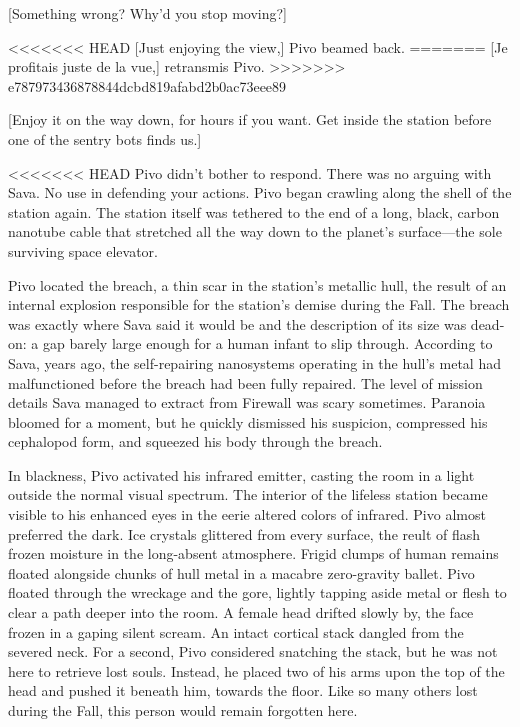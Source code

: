[Something wrong? Why'd you stop moving?] 

<<<<<<< HEAD
[Just enjoying the view,] Pivo beamed back. 
=======
[Je profitais juste de la vue,] retransmis Pivo. 
>>>>>>> e787973436878844dcbd819afabd2b0ac73eee89

[Enjoy it on the way down, for hours if you want. Get inside the station before one of the sentry bots finds us.] 

<<<<<<< HEAD
Pivo didn't bother to respond. There was no arguing with Sava. No use in defending your actions. Pivo began crawling along the shell of the station again. The station itself was tethered to the end of a long, black, carbon nanotube cable that stretched all the way down to the planet's surface—the sole surviving space elevator. 

Pivo located the breach, a thin scar in the station's metallic hull, the result of an internal explosion responsible for the station's demise during the Fall. The breach was exactly where Sava said it would be and the description of its size was dead-on: a gap barely large enough for a human infant to slip through. According to Sava, years ago, the self-repairing nanosystems operating in the hull's metal had malfunctioned before the breach had been fully repaired. The level of mission details Sava managed to extract from Firewall was scary sometimes. Paranoia bloomed for a moment, but he quickly dismissed his suspicion, compressed his cephalopod form, and squeezed his body through the breach. 

In blackness, Pivo activated his infrared emitter, casting the room in a light outside the normal visual spectrum. The interior of the lifeless station became visible to his enhanced eyes in the eerie altered colors of infrared. Pivo almost preferred the dark. Ice crystals glittered from every surface, the reult of flash frozen moisture in the long-absent atmosphere. Frigid clumps of human remains floated alongside chunks of hull metal in a macabre zero-gravity ballet. Pivo floated through the wreckage and the gore, lightly tapping aside metal or flesh to clear a path deeper into the room. A female head drifted slowly by, the face frozen in a gaping silent scream. An intact cortical stack dangled from the severed neck. For a second, Pivo considered snatching the stack, but he was not here to retrieve lost souls. Instead, he placed two of his arms upon the top of the head and pushed it beneath him, towards the floor. Like so many others lost during the Fall, this person would remain forgotten here. 

